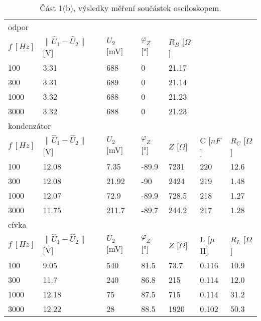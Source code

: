 \documentclass[a4paper,11pt]{article}
\begin{document}
\begin{table}[htpb]
    \centering
    \begin{tabular}{l l l l l l l}
        \hline\hline
        odpor  \\
        $ f\ [Hz] $ & $ \|\hat{U}_1 - \hat{U}_2\|  $ [V] & $ U_2 $ [mV] & $ \varphi_Z $ [°] & $ R_B $ [$ \Omega $] \\
        100  & 3.31  & 688  & 0  & 21.17  \\ 
        300  & 3.31  & 689  & 0  & 21.14  \\ 
        1000 & 3.32  & 688  & 0    & 21.23  \\ 
        3000 & 3.32  & 688  & 0    & 21.23  \\ \hline

        \multicolumn{2}{l}{kondenzátor} \\
        $ f\ [Hz] $ & $ \|\hat{U}_1 - \hat{U}_2\| $ [V] & $ U_2 $ [mV] & $ \varphi_Z $ [°] & $ Z $ [$ \Omega $] & C [$ nF $] & $ R_C $ [$ \Omega $] \\
        100  & 12.08 & 7.35   & -89.9  & 7231  & 220 & 12.6  \\
        300  & 12.08 & 21.92  & -90    & 2424  & 219 & 1.48  \\ 
        1000 & 12.07 & 72.9   & -89.9  & 728.5 & 218 & 1.27  \\ 
        3000 & 11.75 & 211.7  & -89.7  & 244.2 & 217 & 1.28  \\ \hline

        cívka \\
        $ f\ [Hz] $ & $ \|\hat{U}_1 - \hat{U}_2\| $ [V] & $ U_2 $ [mV] & $ \varphi_Z $ [°] & $ Z $ [$ \Omega $] & L [$ \mu $H] & $ R_{L} $ [$ \Omega$] \\
        100  & 9.05  & 540 & 81.5 & 73.7 & 0.116 & 10.9  \\ 
        300  & 11.7  & 240 & 86.8 & 215  & 0.114 & 12.0  \\ 
        1000 & 12.18 & 75  & 87.5 & 715	 & 0.114 & 31.2  \\ 
        3000 & 12.22 & 28  & 88.5 & 1920 & 0.102 & 50.3  \\ \hline\hline
    \end{tabular}
    \caption{Část 1(b), výsledky měření součástek osciloskopem.}
\end{table}
\end{document}
